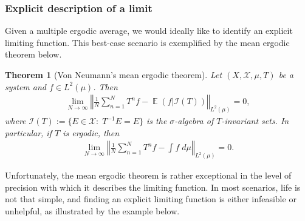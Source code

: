 \documentclass[11pt]{amsart}
\newtheorem{theorem}[lemma]{Theorem}
\theoremstyle{definition}
\DeclareMathOperator*{\E}{\mathbb{E}}
\newcommand{\CI}{{\mathcal I}}
\newcommand{\CX}{{\mathcal X}}
\newcommand{\norm}[1]{\left\Vert #1\right\Vert}
\newcommand{\inv}{^{-1}}
\newcommand{\1}{{\mathbf{1}}}
\begin{document}
\subsubsection{Explicit description of a limit}
Given a multiple ergodic average, we would ideally like to identify an explicit limiting function. This best-case scenario is exemplified by the mean ergodic theorem below.
\begin{theorem}[Von Neumann's mean ergodic theorem]
Let $(X, \CX, \mu, T)$ be a system and $f\in L^2(\mu)$. Then
\begin{align*}
\lim_{N\to\infty}\norm{\frac{1}{N}\sum_{n=1}^N T^n f - \E(f|\CI(T))}_{L^2(\mu)} = 0,
\end{align*}
where $\CI(T) := \{E\in\CX\colon\; T\inv E = E\}$ is the $\sigma$-algebra of $T$-invariant sets. 
In particular, if $T$ is ergodic, then
\begin{align*}
\lim_{N\to\infty}\norm{\frac{1}{N}\sum_{n=1}^N T^n f - \int f\; d\mu}_{L^2(\mu)} = 0.
\end{align*}
\end{theorem}
Unfortunately, the mean ergodic theorem is rather exceptional in the level of precision with which it describes the limiting function. In most scenarios, life is not that simple, and finding an explicit limiting function is either infeasible or unhelpful, as illustrated by the example below.
\end{document}
